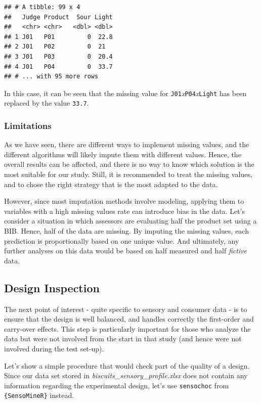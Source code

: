 \documentclass[
]{krantz}
\begin{document}
\begin{verbatim}
## # A tibble: 99 x 4
##   Judge Product  Sour Light
##   <chr> <chr>   <dbl> <dbl>
## 1 J01   P01         0  22.8
## 2 J01   P02         0  21  
## 3 J01   P03         0  20.4
## 4 J01   P04         0  33.7
## # ... with 95 more rows
\end{verbatim}

In this case, it can be seen that the missing value for \texttt{J01}\emph{x}\texttt{P04}\emph{x}\texttt{Light} has been replaced by the value \texttt{33.7}.

\hypertarget{limitations}{%
\subsubsection{Limitations}\label{limitations}}

As we have seen, there are different ways to implement missing values, and the different algorithms will likely impute them with different values. Hence, the overall results can be affected, and there is no way to know which solution is the most suitable for our study. Still, it is recommended to treat the missing values, and to chose the right strategy that is the most adapted to the data.

However, since most imputation methods involve modeling, applying them to variables with a high missing values rate can introduce bias in the data. Let's consider a situation in which assessors are evaluating half the product set using a BIB. Hence, half of the data are missing. By imputing the missing values, each prediction is proportionally based on one unique value. And ultimately, any further analyses on this data would be based on half measured and half \emph{fictive} data.

\hypertarget{design-inspection}{%
\subsection{Design Inspection}\label{design-inspection}}

The next point of interest - quite specific to sensory and consumer data - is to ensure that the design is well balanced, and handles correctly the first-order and carry-over effects. This step is particularly important for those who analyze the data but were not involved from the start in that study (and hence were not involved during the test set-up).

Let's show a simple procedure that would check part of the quality of a design. Since our data set stored in \emph{biscuits\_sensory\_profile.xlsx} does not contain any information regarding the experimental design, let's use \texttt{sensochoc} from \texttt{\{SensoMineR\}} instead.
\end{document}
